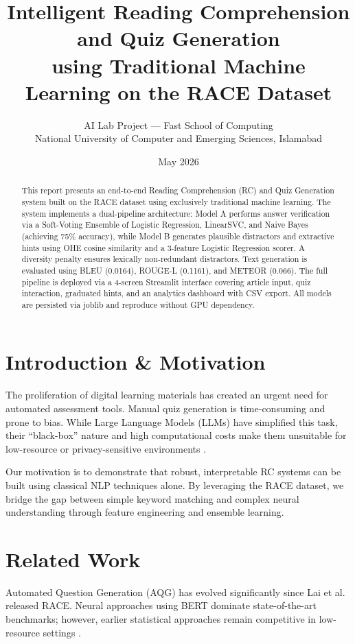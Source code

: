 \documentclass[10pt,twocolumn]{article}
\title{Intelligent Reading Comprehension and Quiz Generation\\using Traditional Machine Learning on the RACE Dataset}
\author{AI Lab Project --- Fast School of Computing \\
National University of Computer and Emerging Sciences, Islamabad}
\date{May 2026}
\begin{document}
\maketitle

\begin{abstract}
This report presents an end-to-end Reading Comprehension (RC) and Quiz Generation system built on the RACE dataset using exclusively traditional machine learning. The system implements a dual-pipeline architecture: Model A performs answer verification via a Soft-Voting Ensemble of Logistic Regression, LinearSVC, and Naive Bayes (achieving 75\% accuracy), while Model B generates plausible distractors and extractive hints using OHE cosine similarity and a 3-feature Logistic Regression scorer. A diversity penalty ensures lexically non-redundant distractors. Text generation is evaluated using BLEU (0.0164), ROUGE-L (0.1161), and METEOR (0.066). The full pipeline is deployed via a 4-screen Streamlit interface covering article input, quiz interaction, graduated hints, and an analytics dashboard with CSV export. All models are persisted via joblib and reproduce without GPU dependency.
\end{abstract}

\section{Introduction \& Motivation}
The proliferation of digital learning materials has created an urgent need for automated assessment tools. Manual quiz generation is time-consuming and prone to bias. While Large Language Models (LLMs) have simplified this task, their ``black-box'' nature and high computational costs make them unsuitable for low-resource or privacy-sensitive environments \cite{race}.

Our motivation is to demonstrate that robust, interpretable RC systems can be built using classical NLP techniques alone. By leveraging the RACE dataset, we bridge the gap between simple keyword matching and complex neural understanding through feature engineering and ensemble learning.

\section{Related Work}
Automated Question Generation (AQG) has evolved significantly since Lai et al.\ \cite{race} released RACE. Neural approaches using BERT \cite{bert} dominate state-of-the-art benchmarks; however, earlier statistical approaches remain competitive in low-resource settings \cite{heilman}.
\end{document}

